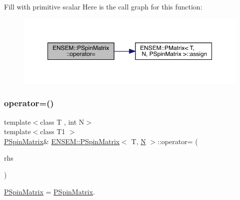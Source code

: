 Fill with primitive scalar Here is the call graph for this function\+:
\nopagebreak
\begin{figure}[H]
\begin{center}
\leavevmode
\includegraphics[width=350pt]{d0/d1e/classENSEM_1_1PSpinMatrix_a0b0ca395b4662cc2f1a18724aa8354e4_cgraph}
\end{center}
\end{figure}
\mbox{\label{classENSEM_1_1PSpinMatrix_a0346425dd32cab35d2f76c9d5cca8533}} 
\subsubsection{\texorpdfstring{operator=()}{operator=()}\hspace{0.1cm}{\footnotesize\ttfamily [7/9]}}
{\footnotesize\ttfamily template$<$class T , int N$>$ \\
template$<$class T1 $>$ \\
\mbox{\hyperlink{classENSEM_1_1PSpinMatrix}{P\+Spin\+Matrix}}\& \mbox{\hyperlink{classENSEM_1_1PSpinMatrix}{E\+N\+S\+E\+M\+::\+P\+Spin\+Matrix}}$<$ T, \mbox{\hyperlink{adat__devel_2lib_2hadron_2operator__name__util_8cc_a7722c8ecbb62d99aee7ce68b1752f337}{N}} $>$\+::operator= (\begin{DoxyParamCaption}\item[{const \mbox{\hyperlink{classENSEM_1_1PSpinMatrix}{P\+Spin\+Matrix}}$<$ T1, \mbox{\hyperlink{adat__devel_2lib_2hadron_2operator__name__util_8cc_a7722c8ecbb62d99aee7ce68b1752f337}{N}} $>$ \&}]{rhs }\end{DoxyParamCaption})\hspace{0.3cm}{\ttfamily [inline]}}



\mbox{\hyperlink{classENSEM_1_1PSpinMatrix}{P\+Spin\+Matrix}} = \mbox{\hyperlink{classENSEM_1_1PSpinMatrix}{P\+Spin\+Matrix}}. 

